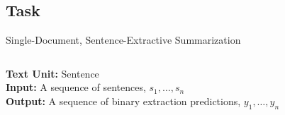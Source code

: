 \subsection{Task}

\begin{frame}{Single-Document, Sentence-Extractive Summarization}
    \begin{columns}
        \begin{column}{0.5\textwidth}
            \textbf{Text Unit:} Sentence\\
            \vspace{10pt}
            \textbf{Input:} A sequence of sentences, $s_1,\ldots, s_n$\\
            \vspace{10pt}
            \textbf{Output:} A sequence of binary extraction predictions, $y_1, \ldots, y_n$
        \end{column}
    \begin{column}{0.5\textwidth}
        \begin{center}
\end{center}
\end{column}
\end{columns}
\end{frame}
